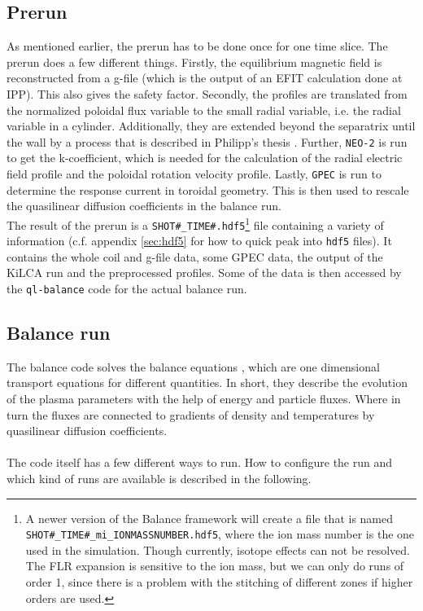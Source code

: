\documentclass[11pt]{article}
\begin{document}
\subsection{Prerun}
\label{sec:prerun}
As mentioned earlier, the prerun has to be done once for one time slice. The prerun does a few different things. Firstly, the equilibrium magnetic field is reconstructed from a g-file (which is the output of an EFIT calculation done at IPP). This also gives the safety factor. Secondly, the profiles are translated from the normalized poloidal flux variable to the small radial variable, i.e. the radial variable in a cylinder. Additionally, they are extended beyond the separatrix until the wall by a process that is described in Philipp's thesis \cite{philippmaster}. Further, \texttt{NEO-2} is run to get the k-coefficient, which is needed for the calculation of the radial electric field profile and the poloidal rotation velocity profile. Lastly, \texttt{GPEC} is run to determine the response current in toroidal geometry. This is then used to rescale the quasilinear diffusion coefficients in the balance run.\\
The result of the prerun is a \texttt{SHOT\#\_TIME\#.hdf5}\footnote{A newer version of the Balance framework will create a file that is named \texttt{SHOT\#\_TIME\#\_mi\_IONMASSNUMBER.hdf5}, where the ion mass number is the one used in the simulation. Though currently, isotope effects can not be resolved. The FLR expansion is sensitive to the ion mass, but we can only do runs of order 1, since there is a problem with the stitching of different zones if higher orders are used.} file containing a variety of information (c.f. appendix \ref{sec:hdf5} for how to quick peak into \texttt{hdf5} files). It contains the whole coil and g-file data, some GPEC data, the output of the KiLCA run and the preprocessed profiles. Some of the data is then accessed by the \texttt{ql-balance} code for the actual balance run.

\subsection{Balance run}
\label{sec:balancerun}
The balance code solves the balance equations \cite{heyn2014}, which are one dimensional transport equations for different quantities. In short, they describe the evolution of the plasma parameters with the help of energy and particle fluxes. Where in turn the fluxes are connected to gradients of density and temperatures by quasilinear diffusion coefficients.\\\\
The code itself has a few different ways to run. How to configure the run and which kind of runs are available is described in the following. 
\end{document}
